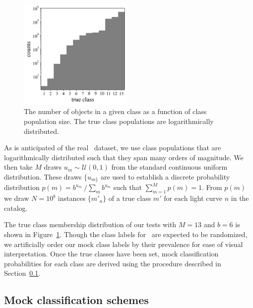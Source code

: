 \begin{figure}
	\begin{center}
    \includegraphics[width=0.49\textwidth]{./fig/complete_counts.png}
		\caption{The number of objects in a given class as a function of class population size.
		The true class populations are logarithmically distributed.}
		\label{fig:classdist}
	\end{center}
\end{figure}

As is anticipated of the real \lsst\ dataset, we use class populations that are logarithmically distributed such that they span many orders of magnitude.
We then take $M$ draws $u_{m} \sim \mathcal{U}(0, 1)$ from the standard continuous uniform distribution.
These draws $\{u_{m\}}$ are used to establish a discrete probability distribution $p(m) = b^{u_{m}}\ / \sum_{m} b^{u_{m}}$ such that $\sum_{m=1}^{M} p(m) = 1$.
From $p(m)$ we draw $N = 10^{b}$ instances $\{m'_{n}\}$ of a true class $m'$ for each light curve $n$ in the catalog.

The true class membership distribution of our tests with $M = 13$ and $b = 6$ is shown in Figure~\ref{fig:classdist}.
Though the class labels for \plasticc\ are expected to be randomized, we artificially order our mock class labels by their prevalence for ease of visual interpretation.
Once the true classes have been set, mock classification probabilities for each class are derived using the procedure described in Section~\ref{sec:mockdata}.

\subsection{Mock classification schemes}
\label{sec:mockdata}

